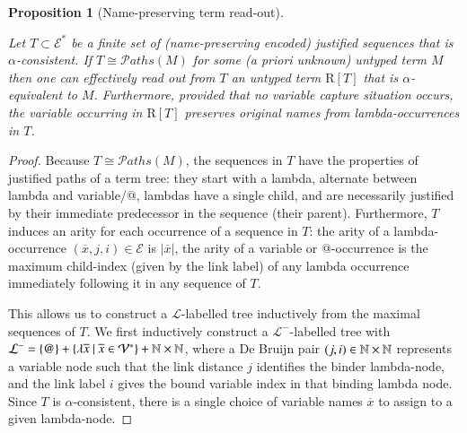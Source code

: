 \documentclass{elsarticle}
\theoremstyle{plain}
\newtheorem{proposition}[theorem]{Proposition}
\theoremstyle{definition}
\def\structisomorphic{\cong} %
\def\readout{\mathrm{R}} %
\def\nameencoding{\mathcal{E}} %
\newcommand\pathset{{\mathcal{P}aths}} %
\begin{document}
\begin{proposition}[Name-preserving term read-out]
\label{proposition:termtree_readout_from_justitied_paths}

Let $T\subset \nameencoding^*$ be a finite set of (name-preserving encoded) justified sequences  that is $\alpha$-consistent.
If $T\structisomorphic \pathset(M)$ for some (a priori unknown) untyped term $M$ then one can effectively read out from $T$ an untyped
term  $\readout[T]$ that is $\alpha$-equivalent to $M$.
%
Furthermore, provided that no variable capture situation occurs, the variable  occurring in $\readout[T]$ preserves original names from lambda-occurrences in $T$.
\end{proposition}
\begin{proof}
    Because $T \structisomorphic \pathset(M)$, the sequences in $T$ have the properties
of justified paths of a term tree: they start with a lambda, alternate between lambda and variable/@, lambdas have
a single child, and are necessarily justified by their immediate predecessor in the sequence (their parent).
Furthermore, $T$ induces an arity for each occurrence of a sequence in $T$: the arity of a lambda-occurrence $(\overline{x},j,i)\in\nameencoding$ is $|\overline{x}|$, the arity of a variable or @-occurrence is the maximum
child-index (given by the link label) of any lambda occurrence immediately following it in any sequence of $T$.

This allows us to construct a $\mathcal{L}$-labelled tree
inductively from the maximal sequences of $T$.
We first inductively construct a $\mathcal{L^-}$-labelled tree with
$\mathcal{L^-} = \{ @ \} + \{
    \lambda \overline{x} \ | \
    \overline{x} \in \mathcal{V}^* \} + \mathbb{N}\times\mathbb{N}$,
where a De Bruijn pair $(j,i)\in \mathbb{N}\times\mathbb{N}$ represents a variable node such that the link distance $j$ identifies the binder lambda-node, and the link label $i$ gives the bound variable index in that binding lambda node. Since $T$ is $\alpha$-consistent, there is a single choice of variable names $\overline{x}$ to assign to a given lambda-node.


\end{proof}
\end{document}
